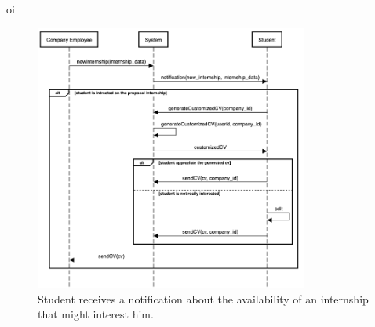 oi
    \begin{figure}[H]
        \centering
        \includegraphics[width=0.8\textwidth]{RASD/Assets/SequenceDiagrams/5-student-receives-a-notification.png}
        \caption{Student receives a notification about the availability of an internship that might interest him.}
        \label{fig:Student receive a notification about the availability of an internship that might interest him}
    \end{figure}

